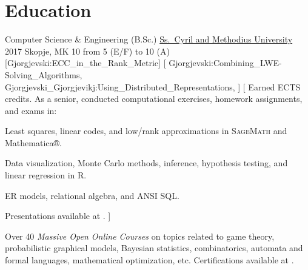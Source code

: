 \documentclass[%
version=last,%
fontsize=11pt,%
paper=A4,%
headinclude=false,%
footinclude=false,%
headlines=0,%
footlines=0,%
areasetadvanced,%
toc=bibnumbered,%
]{scrartcl}%
\begin{document}
\begin{minipage}[t]{.575\textwidth}
  \section{Education}%
  \label{sec:education}
  \EducationEntry%
  {Computer Science \& Engineering (B.Sc.)}%
  {\href{http://ukim.edu.mk/}{Ss.\ Cyril and Methodius University}}%
  {2017}%
  {Skopje, MK}%
  {10}%
  {from 5 (E/F) to 10 (A)}%
  [Gjorgjevski:ECC_in_the_Rank_Metric]%
  [%
  Gjorgjevski:Combining_LWE-Solving_Algorithms,%
  Gjorgjevski_Gjorgjevikj:Using_Distributed_Representations,%
  ]%
  [%
  Earned  ECTS credits.  As a senior, conducted computational
  exercises, homework assignments, and exams in:
  \begin{description}%
    [leftmargin=*,widest=Linear Algebra,font=\normalfont\itshape]
  \item[Linear Algebra] Least squares, linear codes, and low\-/rank
    approximations in \textsc{SageMath} and Mathematica®.
  \item[Statistics] Data visualization, Monte Carlo methods, inference,
    hypothesis testing, and linear regression in R.
  \item[Databases] ER models, relational algebra, and ANSI SQL\@.
  \end{description}
  Presentations available at .%
  ]

  \begin{tcolorbox}[%
    size=fbox,%
    fontlower=\small,%
    ]
    Over \num{40} \emph{Massive Open Online Courses} on topics related to game
    theory, probabilistic graphical models, Bayesian statistics, combinatorics,
    automata and formal languages, mathematical optimization, etc.%
    \tcblower%
    Certifications available at
    .
  \end{tcolorbox}

  \printbibliography[type=thesis,title=Theses]%
  \printbibliography[nottype=thesis,title=Publications]
\end{minipage}%
\hfill%
\end{document}
